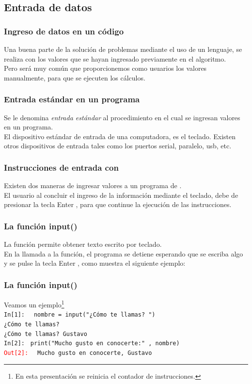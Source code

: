 \subsection{Entrada de datos}
\begin{frame}
\frametitle{Ingreso de datos en un código}
Una buena parte de la solución de problemas mediante el uso de un lenguaje, se realiza con los valores que se hayan ingresado previamente en el algoritmo.
\\
\bigskip
Pero será muy común que proporcionemos como usuarios los valores manualmente, para que se ejecuten los cálculos.
\end{frame}
\begin{frame}\frametitle{Entrada estándar en un programa}
Se le denomina \emph{entrada estándar} al procedimiento en el cual se ingresan valores en un programa.
\\
\bigskip
El dispositivo estándar de entrada de una computadora, es el teclado. Existen otros dispositivos de entrada tales como los puertos serial, paralelo, usb, etc.
\end{frame}
\begin{frame}
\frametitle{Instrucciones de entrada con \python}
Existen dos maneras de ingresar valores a un programa de \python.
\\
\bigskip
El usuario al concluir el ingreso de la información mediante el teclado, debe de presionar la tecla Enter \keys{\return}, para que continue la ejecución de las instrucciones.
\end{frame}
\begin{frame}[fragile]
\frametitle{La función input()}
La función  permite obtener texto escrito por teclado.
\\
\bigskip
En la llamada a la función, el programa se detiene esperando que se escriba algo y se pulse la tecla Enter \keys{\return}, como muestra el siguiente ejemplo:
\end{frame}
\begin{frame}[fragile]
\frametitle{La función input()}
Veamos un ejemplo\footnote{En esta presentación se reinicia el contador de instrucciones.}
\\
\bigskip
\textcolor{ao}{\texttt{In[1]: }} \verb| nombre = input("¿Cómo te llamas? ")|
\\
\pause
\verb|¿Cómo te llamas?|
\\
\pause
\verb|¿Cómo te llamas? Gustavo|
\\
\pause
\textcolor{ao}{\texttt{In[2]: }} \verb|print("Mucho gusto en conocerte:" , nombre)|
\\
\pause
\textcolor{red}{\texttt{Out[2]: }} \verb| Mucho gusto en conocerte, Gustavo|
\end{frame}
